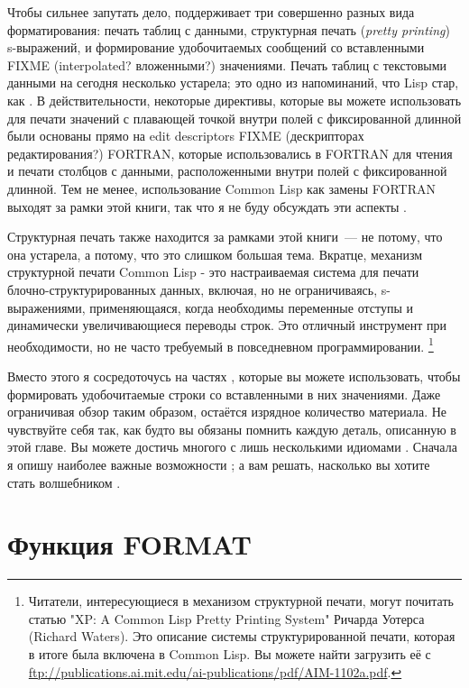 {Чтобы сильнее запутать дело,  поддерживает три совершенно разных вида
форматирования: печать таблиц с данными, структурная печать (\textit{pretty printing})
s-выражений, и формирование удобочитаемых сообщений со вставленными FIXME (interpolated?
вложенными?) значениями. Печать таблиц с текстовыми данными на сегодня несколько устарела;
это одно из напоминаний, что Lisp стар, как . В действительности, некоторые
директивы, которые вы можете использовать для печати значений с плавающей точкой внутри
полей с фиксированной длинной были основаны прямо на edit descriptors FIXME (дескрипторах
редактирования?) FORTRAN, которые использовались в FORTRAN для чтения и печати столбцов с
данными, расположенными внутри полей с фиксированной длинной. Тем не менее, использование
Common Lisp как замены FORTRAN выходят за рамки этой книги, так что я не буду обсуждать
эти аспекты .

Структурная печать также находится за рамками этой книги~--- не потому, что она устарела, а
потому, что это слишком большая тема. Вкратце, механизм структурной печати Common Lisp -
это настраиваемая система для печати блочно-структурированных данных, включая, но не
ограничиваясь, s-выражениями, применяющаяся, когда необходимы переменные отступы и
динамически увеличивающиеся переводы строк. Это отличный инструмент при необходимости, но
не часто требуемый в повседневном программировании. \footnote{Читатели, интересующиеся в
  механизом структурной печати, могут почитать статью "XP: A Common Lisp Pretty Printing
  System" Ричарда Уотерса (Richard Waters). Это описание системы структурированной печати,
  которая в итоге была включена в Common Lisp. Вы можете найти загрузить её с
  \url{ftp://publications.ai.mit.edu/ai-publications/pdf/AIM-1102a.pdf}.}

Вместо этого я сосредоточусь на частях , которые вы можете использовать,
чтобы формировать удобочитаемые строки со вставленными в них значениями. Даже ограничивая
обзор таким образом, остаётся изрядное количество материала. Не чувствуйте себя так, как
будто вы обязаны помнить каждую деталь, описанную в этой главе. Вы можете достичь многого
с лишь несколькими идиомами . Сначала я опишу наиболее важные возможности
; а вам решать, насколько вы хотите стать волшебником .
 
\section{Функция FORMAT}

}
